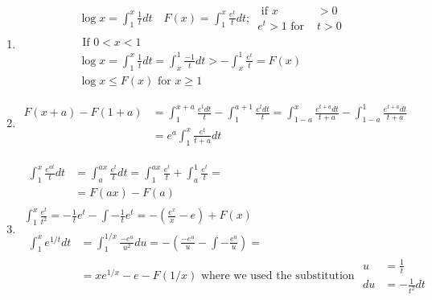\documentclass[twoside]{amsart}
\theoremstyle{plain}
\theoremstyle{definition}
\newcommand{\exercisehead}[1]
  {\smallskip
   \noindent{\small\bf Exercise #1.}}
\begin{document}
\exercisehead{6} 
\begin{enumerate}
\item \[
\begin{gathered}
\log{x} = \int_1^x \frac{1}{t} dt  \quad F(x) = \int_1^x \frac{e^t}{t} dt ; \, \begin{aligned} \text{ if } x & > 0 \\ e^t > 1 \text{ for } & t > 0 \end{aligned} \\
\text{ If } 0 < x < 1 \\
\log{x} = \int_1^x \frac{1}{t} dt = \int_x^1 \frac{-1}{t} dt > - \int_x^1 \frac{e^t}{t} = F(x) \\
\boxed{ \log{x} \leq F(x) \text{ for } x \geq 1  }
\end{gathered}
\]
\item \[
\begin{aligned}
  F(x+a)-F(1+a) &= \int_1^{x+a} \frac{e^t dt }{ t } - \int_1^{a+1} \frac{e^t dt }{ t } = \int_{1-a}^x \frac{ e^{t+a} dt }{ t+a} - \int_{1-a}^1 \frac{ e^{t+a} dt }{ t+a} \\
  & = e^a \int_1^x \frac{e^t}{ t+a} dt  
\end{aligned}
\]
\item \[
\begin{gathered}
\begin{aligned}
  \int_1^x \frac{ e^{at}}{t} dt & = \int_{a}^{ax} \frac{ e^t}{t} dt = \int_1^{ax} \frac{e^t}{t} + \int_a^1 \frac{e^t}{t} = \\
  & = \boxed{ F(ax) - F(a) }
\end{aligned} \\
\int_1^x \frac{e^t}{t^2} = -\frac{1}{t} e^t - \int -\frac{1}{t} e^t = \boxed{ - \left( \frac{e^x}{x} - e \right) + F(x) } \\
  \begin{aligned}
  \int_1^x e^{1/t} dt & = \int_1^{1/x} \frac{ -e^u }{ u^2 } du = - \left( \frac{-e^u }{u } - \int -\frac{e^u }{u } \right) = \\ 
&= \boxed{ x e^{1/x} - e - F(1/x)} \text{ where  we used the substitution } \begin{aligned} u & = \frac{1}{t} \\ du & = -\frac{1}{t^2} dt \end{aligned} 
\end{aligned}
\end{gathered}
\]
\end{enumerate}
\end{document}
